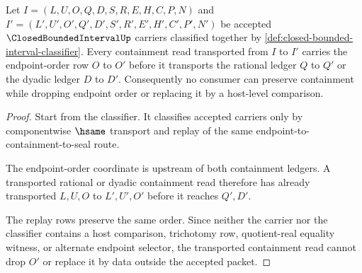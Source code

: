 \begin{theorem}
\label{thm:closed-bounded-interval-endpoint-order-transport}
Let $I=(L,U,O,Q,D,S,R,E,H,C,P,N)$ and $I'=(L',U',O',Q',D',S',R',E',H',C',P',N')$ be accepted $\ClosedBoundedIntervalUp$ carriers classified together by \autoref{def:closed-bounded-interval-classifier}. Every containment read transported from $I$ to $I'$ carries the endpoint-order row $O$ to $O'$ before it transports the rational ledger $Q$ to $Q'$ or the dyadic ledger $D$ to $D'$. Consequently no consumer can preserve containment while dropping endpoint order or replacing it by a host-level comparison.
\end{theorem}
\begin{proof}
Start from the classifier. It classifies accepted carriers only by componentwise $\hsame$ transport and replay of the same endpoint-to-containment-to-seal route.

The endpoint-order coordinate is upstream of both containment ledgers. A transported rational or dyadic containment read therefore has already transported $L,U,O$ to $L',U',O'$ before it reaches $Q',D'$.

The replay rows preserve the same order. Since neither the carrier nor the classifier contains a host comparison, trichotomy row, quotient-real equality witness, or alternate endpoint selector, the transported containment read cannot drop $O'$ or replace it by data outside the accepted packet.
\end{proof}


